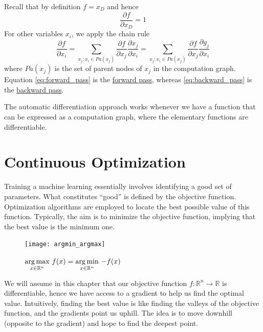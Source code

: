 \documentclass{article}
\begin{document}
Recall that by definition $f=x_D$ and hence
$$\frac{\partial{f}}{\partial{x_D}}=1$$
For other variables $x_i$, we apply the chain rule 
\begin{equation}\label{eq:backward_pass}
    \frac{\partial{f}}{\partial{x_i}}=\displaystyle\sum_{x_j:x_i\in
    Pa(x_j)}\frac{\partial{f}}{\partial{x_j}}\frac{\partial{x_j}}{\partial{x_i}}=\displaystyle\sum_{x_j:x_i\in
    Pa(x_j)}\frac{\partial{f}}{\partial{x_j}}\frac{\partial{g_j}}{\partial{x_i}}
\end{equation}
where $Pa(x_j)$ is the set of parent nodes of $x_j$ in the computation graph.
Equation \ref{eq:forward_pass} is the \underline{forward pass}, whereas
\ref{eq:backward_pass} is the \underline{backward pass}.

The automatic differentiation approach works whenever we have a function that
can be expressed as a computation graph, where the elementary functions are
differentiable. 
\cleardoublepage
\section{Continuous Optimization}
Training a machine learning essentially involves identifying a good set of
parameters. What constitutes ``good'' is defined by the objective function.
Optimization algorithms are employed to locate the best possible value of this
function. Typically, the aim is to minimize the objective function, implying
that the best value is the minimum one.

\begin{figure}[!h]
   \centering
   \texttt{[image: argmin\_argmax]}
   \caption{$\underset{x\in \mathbb{R}^n}{\operatorname*{arg\,max}}\
   f(x)=\underset{x\in\mathbb{R}^n}{\operatorname*{arg\,min}}\ {-f(x)}$}
\end{figure}

We will assume in this chapter that our objective function $f:\mathbb{R}^n\to
\mathbb{R}$ is differentiable, hence we have access to a gradient to help us
find the optimal value. Intuitively, finding the best value is like finding
the valleys of the objective function, and the gradients point us uphill. The
idea is to move downhill (opposite to the gradient) and hope to find the
deepest point.
\end{document}
